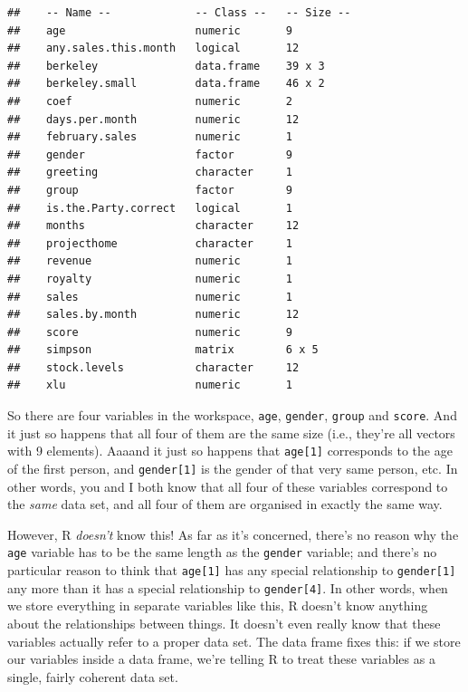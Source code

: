 \documentclass[
]{book}
\begin{document}
\begin{verbatim}
##    -- Name --             -- Class --   -- Size --
##    age                    numeric       9         
##    any.sales.this.month   logical       12        
##    berkeley               data.frame    39 x 3    
##    berkeley.small         data.frame    46 x 2    
##    coef                   numeric       2         
##    days.per.month         numeric       12        
##    february.sales         numeric       1         
##    gender                 factor        9         
##    greeting               character     1         
##    group                  factor        9         
##    is.the.Party.correct   logical       1         
##    months                 character     12        
##    projecthome            character     1         
##    revenue                numeric       1         
##    royalty                numeric       1         
##    sales                  numeric       1         
##    sales.by.month         numeric       12        
##    score                  numeric       9         
##    simpson                matrix        6 x 5     
##    stock.levels           character     12        
##    xlu                    numeric       1
\end{verbatim}

So there are four variables in the workspace, \texttt{age}, \texttt{gender}, \texttt{group} and \texttt{score}. And it just so happens that all four of them are the same size (i.e., they're all vectors with 9 elements). Aaaand it just so happens that \texttt{age{[}1{]}} corresponds to the age of the first person, and \texttt{gender{[}1{]}} is the gender of that very same person, etc. In other words, you and I both know that all four of these variables correspond to the \emph{same} data set, and all four of them are organised in exactly the same way.

However, R \emph{doesn't} know this! As far as it's concerned, there's no reason why the \texttt{age} variable has to be the same length as the \texttt{gender} variable; and there's no particular reason to think that \texttt{age{[}1{]}} has any special relationship to \texttt{gender{[}1{]}} any more than it has a special relationship to \texttt{gender{[}4{]}}. In other words, when we store everything in separate variables like this, R doesn't know anything about the relationships between things. It doesn't even really know that these variables actually refer to a proper data set. The data frame fixes this: if we store our variables inside a data frame, we're telling R to treat these variables as a single, fairly coherent data set.
\end{document}
